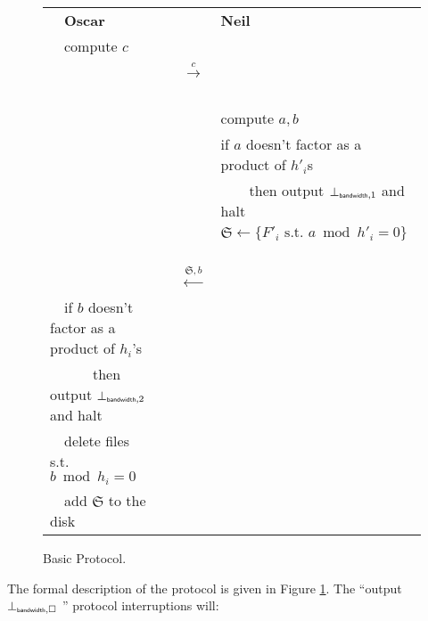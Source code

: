 \documentclass[11pt]{llncs}
\begin{document}
\begin{figure}
\begin{center}
\begin{tabular}{|lcl|}\hline
~~{\bf Oscar}                       &                                                      &   {\bf Neil}~\\
~~compute $c$&                                                      &\\
                                   &~~{{\LARGE $\stackrel{c}{\longrightarrow}$}}~~        &   \\
                                   &                                                      &compute $a,b$~\\
                                   &                                                      &if $a$ doesn't factor as a product of $h'_i$s~~\\
                                   &                                                      &~~~~then output $\bot_{\mbox{{\tiny {\sf bandwidth}}},1}$ and halt~~\\
                                   &                                                      &$\mathfrak{S}\leftarrow\{F'_i \mbox{~s.t.~} a \bmod h'_i =0\}$~~\\
                                   &~~{\LARGE $\stackrel{\mathfrak{S},b}{\longleftarrow}$}&\\
~~if $b$ doesn't factor as a product of $h_i$'s&&\\
~~~~~~then output $\bot_{\mbox{{\tiny {\sf bandwidth}}},2}$ and halt &&\\
~~delete files s.t. $b \bmod h_i =0$&                                                      &\\
~~add $\mathfrak{S}$ to the disk    &                                                      &\\\hline
\end{tabular}
\end{center}
\caption{Basic Protocol.}\label{fig:one}
\end{figure}

The formal description of the protocol is given in Figure \ref{fig:one}. The ``output $\bot_{\mbox{{\tiny {\sf bandwidth}}},\square}$ '' protocol interruptions will:
\end{document}

